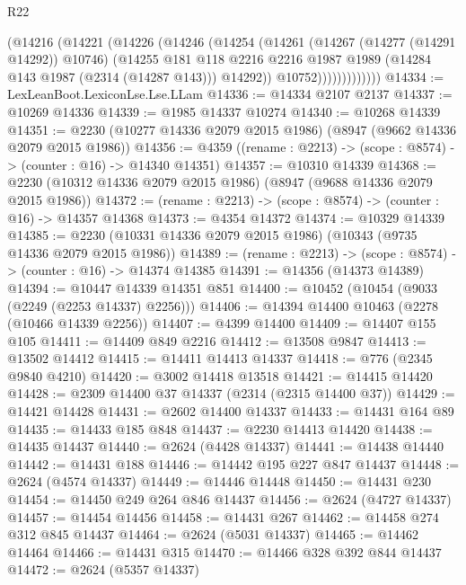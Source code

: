 \begin{lexlean}{R22}
\begin{coremodule}
                    (@14216
                      (@14221
                        (@14226
                          (@14246
                            (@14254
                              (@14261
                                (@14267 (@14277 (@14291 @14292)) @10746)
                                (@14255
                                  @181
                                  @118
                                  @2216
                                  @2216
                                  @1987
                                  @1989
                                  (@14284 @143 @1987 (@2314 (@14287 @143)))
                                  @14292))
                              @10752)))))))))))))
@14334 := LexLeanBoot.LexiconLse.Lse.LLam
@14336 := @14334 @2107 @2137
@14337 := @10269 @14336
@14339 := @1985 @14337 @10274
@14340 := @10268 @14339
@14351 := @2230 (@10277 @14336 @2079 @2015 @1986) (@8947 (@9662 @14336 @2079 @2015 @1986))
@14356 := @4359 ((rename : @2213) -> (scope : @8574) -> (counter : @16) -> @14340 @14351)
@14357 := @10310 @14339
@14368 := @2230 (@10312 @14336 @2079 @2015 @1986) (@8947 (@9688 @14336 @2079 @2015 @1986))
@14372 := (rename : @2213) -> (scope : @8574) -> (counter : @16) -> @14357 @14368
@14373 := @4354 @14372
@14374 := @10329 @14339
@14385 := @2230 (@10331 @14336 @2079 @2015 @1986) (@10343 (@9735 @14336 @2079 @2015 @1986))
@14389 := (rename : @2213) -> (scope : @8574) -> (counter : @16) -> @14374 @14385
@14391 := @14356 (@14373 @14389)
@14394 := @10447 @14339 @14351 @851
@14400 := @10452 (@10454 (@9033 (@2249 (@2253 @14337) @2256)))
@14406 := @14394 @14400 @10463 (@2278 (@10466 @14339 @2256))
@14407 := @4399 @14400
@14409 := @14407 @155 @105
@14411 := @14409 @849 @2216
@14412 := @13508 @9847
@14413 := @13502 @14412
@14415 := @14411 @14413 @14337
@14418 := @776 (@2345 @9840 @4210)
@14420 := @3002 @14418 @13518
@14421 := @14415 @14420
@14428 := @2309 @14400 @37 @14337 (@2314 (@2315 @14400 @37))
@14429 := @14421 @14428
@14431 := @2602 @14400 @14337
@14433 := @14431 @164 @89
@14435 := @14433 @185 @848
@14437 := @2230 @14413 @14420
@14438 := @14435 @14437
@14440 := @2624 (@4428 @14337)
@14441 := @14438 @14440
@14442 := @14431 @188
@14446 := @14442 @195 @227 @847 @14437
@14448 := @2624 (@4574 @14337)
@14449 := @14446 @14448
@14450 := @14431 @230
@14454 := @14450 @249 @264 @846 @14437
@14456 := @2624 (@4727 @14337)
@14457 := @14454 @14456
@14458 := @14431 @267
@14462 := @14458 @274 @312 @845 @14437
@14464 := @2624 (@5031 @14337)
@14465 := @14462 @14464
@14466 := @14431 @315
@14470 := @14466 @328 @392 @844 @14437
@14472 := @2624 (@5357 @14337)

\end{coremodule}
\end{lexlean}
